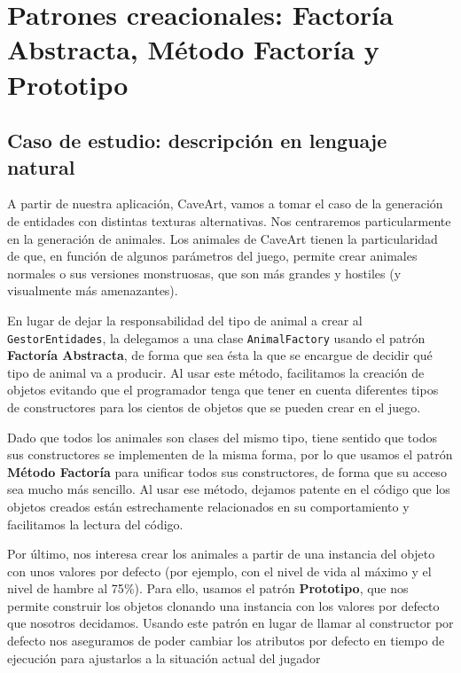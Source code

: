 \chapter{Patrones creacionales: Factoría Abstracta, Método Factoría y Prototipo}

\section{Caso de estudio: descripción en lenguaje natural}

A partir de nuestra aplicación, CaveArt, vamos a tomar el caso de la generación de entidades con distintas texturas alternativas.
Nos centraremos particularmente en la generación de animales.
Los animales de CaveArt tienen la particularidad de que, en función de algunos parámetros del juego, permite crear animales normales o sus versiones monstruosas, que son más grandes y hostiles (y visualmente más amenazantes).

En lugar de dejar la responsabilidad del tipo de animal a crear al \texttt{GestorEntidades}, la delegamos a una clase \texttt{AnimalFactory} usando el patrón \textbf{Factoría Abstracta}, de forma que sea ésta la que se encargue de decidir qué tipo de animal va a producir.
Al usar este método, facilitamos la creación de objetos evitando que el programador tenga que tener en cuenta diferentes tipos de constructores para los cientos de objetos que se pueden crear en el juego.

Dado que todos los animales son clases del mismo tipo, tiene sentido que todos sus constructores se implementen de la misma forma, por lo que usamos el patrón \textbf{Método Factoría} para unificar todos sus constructores, de forma que su acceso sea mucho más sencillo.
Al usar ese método, dejamos patente en el código que los objetos creados están estrechamente relacionados en su comportamiento y facilitamos la lectura del código.

Por último, nos interesa crear los animales a partir de una instancia del objeto con unos valores por defecto (por ejemplo, con el nivel de vida al máximo y el nivel de hambre al 75{\%}).
Para ello, usamos el patrón \textbf{Prototipo}, que nos permite construir los objetos clonando una instancia con los valores por defecto que nosotros decidamos.
Usando este patrón en lugar de llamar al constructor por defecto nos aseguramos de poder cambiar los atributos por defecto en tiempo de ejecución para ajustarlos a la situación actual del jugador

\pagebreak

